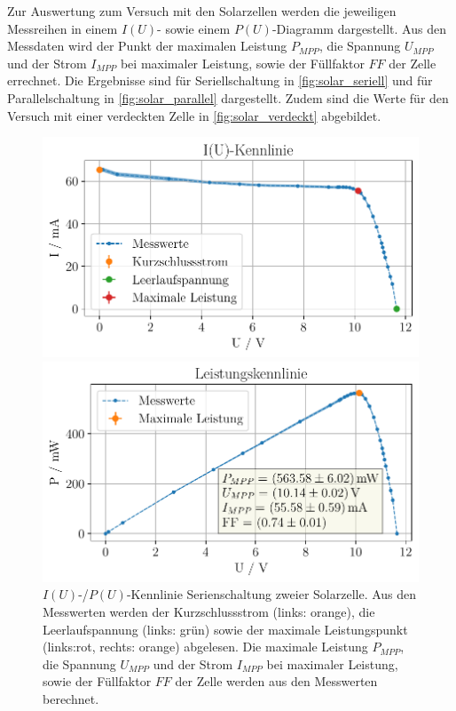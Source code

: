 \documentclass[english, ngerman]{scrartcl}
\newcommand{\FF}{\ensuremath{\mathit{FF}}}
\begin{document}
Zur Auswertung zum Versuch mit den Solarzellen werden die jeweiligen Messreihen in einem $I(U)$- sowie einem $P(U)$-Diagramm dargestellt. Aus den Messdaten wird der Punkt der maximalen Leistung $P_{MPP}$, die Spannung $U_{MPP}$ und der Strom $I_{MPP}$ bei maximaler Leistung, sowie der Füllfaktor $\FF$ der Zelle errechnet. Die Ergebnisse sind für Seriellschaltung in \autoref{fig:solar_seriell} und für Parallelschaltung in \autoref{fig:solar_parallel} dargestellt. Zudem sind die Werte für den Versuch mit einer verdeckten Zelle in \autoref{fig:solar_verdeckt} abgebildet.
%
\setcapindent{0pt}
\begin{figure}[H]
    \centering
    \begin{minipage}[t]{0.485\linewidth}
        \centering
        \includegraphics[width=\linewidth]{fig/plots/solar_seriell_UI_.pdf}
    \end{minipage}%
    \hspace*{\fill}
    \begin{minipage}[t]{0.485\linewidth}
        \centering
        \includegraphics[width=\linewidth]{fig/plots/solar_seriell_UP_.pdf}
    \end{minipage}
    \caption[$I(U)$-/$P(U)$-Kennlinie Serienschaltung Solarzelle]{$I(U)$-/$P(U)$-Kennlinie Serienschaltung zweier Solarzelle. Aus den Messwerten werden der Kurzschlussstrom (links: orange), die Leerlaufspannung (links: grün) sowie der maximale Leistungspunkt (links:rot, rechts: orange) abgelesen. Die maximale Leistung $P_{MPP}$, die Spannung $U_{MPP}$ und der Strom $I_{MPP}$ bei maximaler Leistung, sowie der Füllfaktor $\FF$ der Zelle werden aus den Messwerten berechnet.}
    \label{fig:solar_seriell}
\end{figure}
\end{document}
